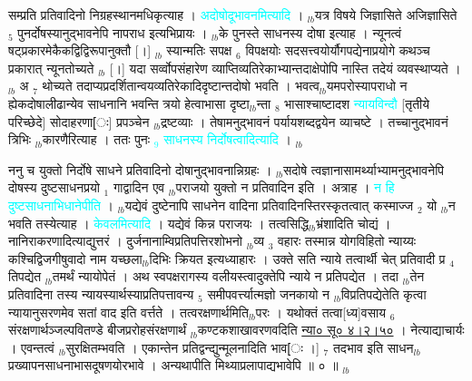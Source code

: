 \documentclass[article,12pt,a4paper]{memoir}%
\newcommand{\quotelemma}[1]{\textcolor{cyan}{#1}}
\newcounter{parCount}
\begin{document}
	  
	  \pstart \leavevmode%
	\hphantom{.}सम्प्रति प्रतिवादिनो निग्रहस्थानमधिकृत्याह । \quotelemma{अदोषोदूभावनमित्यादि} \cite[7b6]{vn-msN} । {\tiny $_{lb}$}यत्र विषये जिज्ञासिते अजिज्ञासिते {\tiny $_{5}$} पुनर्दोषस्यानुद्भावनेपि नापराध इत्यभिप्रायः । {\tiny $_{lb}$}के पुनस्ते साधनस्य दोषा इत्याह । न्यूनत्वं षट्प्रकारमेकैकद्विद्विरूपानुक्तौ [।] {\tiny $_{lb}$} स्यान्मतिः सपक्ष {\tiny $_{6}$} विपक्षयोः सदसत्त्वयोर्यौगपद्येनाप्रयोगे कथञ्च प्रकारात् न्यूनतोच्यते {\tiny $_{lb}$} [।] यदा सर्व्वोपसंहारेण व्याप्तिव्यतिरेकाभ्यान्तदाक्षेपोपि नास्ति तदेयं व्यवस्थाप्यते । {\tiny $_{lb}$} \leavevmode{} अ {\tiny $_{7}$} थोच्यते तदाप्यप्रदर्शितान्वयव्यतिरेकादिदृष्टान्तदोषो भवति । भवत्व{\tiny $_{lb}$}यमपरोस्यापराधो न ह्येकदोषालीढान्येव साधनानि भवन्ति त्रयो हेत्वाभासा दृष्टा{\tiny $_{lb}$}न्ता {\tiny $_{8}$} \leavevmode{} भासाश्चाष्टादश \quotelemma{न्यायविन्दौ} [तृतीये परिच्छेदे] सोदाहरणा[ः] प्रपञ्चेन {\tiny $_{lb}$}द्रष्टव्याः । तेषामनुद्भावनं पर्यायशब्दद्वयेन व्याचष्टे । तच्चानुद्भावनं त्रिभिः {\tiny $_{lb}$}कारणैरित्याह । ततः पुनः \quotelemma{{\tiny $_{9}$} साधनस्य निर्दोषत्वादित्यादि} ।
	{}
	\pend%
      {\tiny $_{lb}$}

	  
	  \pstart \leavevmode%
	ननु च युक्तो निर्दोषे साधने प्रतिवादिनो दोषानुद्भावनान्निग्रहः । {\tiny $_{lb}$}सदोषे त्वज्ञानासामर्थ्याभ्यामनुद्भावनेपि दोषस्य दुष्टसाधनप्रयो {\tiny $_{1}$} गाद्वादिन एव {\tiny $_{lb}$}पराजयो युक्तो न प्रतिवादिन इति । अत्राह । \quotelemma{न हि दुष्टसाधनाभिधानेपीति} \cite[7b8]{vn-msN} । {\tiny $_{lb}$}यद्येवं दुष्टेनापि साधनेन वादिना प्रतिवादिनस्तिरस्कृतत्वात् कस्माज्ज {\tiny $_{2}$} यो {\tiny $_{lb}$}न भवति तस्येत्याह । \quotelemma{केवलमित्यादि} \cite[7b9]{vn-msN} । यद्येवं किन्न पराजयः । तत्वसिद्धि{\tiny $_{lb}$}भ्रंशादिति चोद्यं । नानिराकरणादित्याद्युत्तरं । दुर्जनानाम्विप्रतिपत्तिरशोभनो {\tiny $_{lb}$}व्य {\tiny $_{3}$} वहारः तस्मान्न योगविहितो न्याय्यः कश्चिद्विजगीषुवादो नाम यच्छला{\tiny $_{lb}$}दिभिः क्रियत इत्यध्याहारः । उक्ते सति न्याये तत्वार्थी चेत् प्रतिवादी प्र {\tiny $_{4}$} तिपद्येत {\tiny $_{lb}$}तमर्थं न्यायोपेतं । अथ स्वपक्षरागस्य वलीयस्त्वादुक्तेपि न्याये न प्रतिपद्येत । तदा {\tiny $_{lb}$}तेन प्रतिवादिना तस्य न्यायस्यार्थस्याप्रतिपत्तावन्य {\tiny $_{5}$} समीपवर्त्त्यात्मज्ञो जनकायो न {\tiny $_{lb}$}विप्रतिपद्येतेति कृत्वा न्यायानुसरणमेव सतां वाद इति वर्त्तते । तत्वरक्षणार्थमिति{\tiny $_{lb}$}परः । यथोक्तं तत्वा[ध्य]वसाय {\tiny $_{6}$} संरक्षणार्थञ्जल्पवितण्डे बीजप्ररोहसंरक्षणार्थं {\tiny $_{lb}$}कण्टकशाखावरणवदिति \href{http://sarit.indology.info/?cref=ns\%C5\%AB.4.2.50}{न्या० सू० ४।२।५०} । नेत्याद्याचार्यः । एवन्तत्वं {\tiny $_{lb}$}सुरक्षितम्भवति । एकान्तेन प्रतिद्वन्द्युन्मूलनादिति भाव[ः ।] {\tiny $_{7}$} तदभाव इति साधन{\tiny $_{lb}$}प्रख्यापनसाधनाभासदूषणयोरभावे । अन्यथापीति मिथ्याप्रलापाद्यभावेपि ॥ ० ॥
	{}
	\pend%
      {\tiny $_{lb}$}
\end{document}
